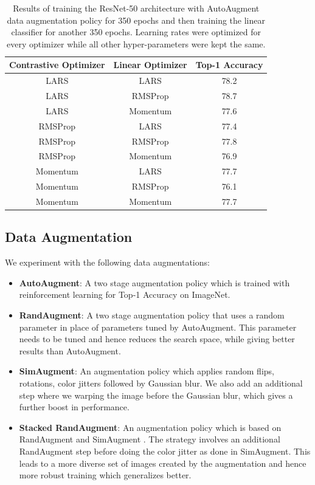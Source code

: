 \begin{table}[ht]
    \centering
    \begin{tabular}{ccc}\toprule
        {Contrastive Optimizer} & Linear Optimizer & Top-1 Accuracy \\\midrule
        LARS & LARS & 78.2 \\
        LARS & RMSProp & 78.7 \\
        LARS & Momentum & 77.6 \\ 
        RMSProp & LARS & 77.4 \\
        RMSProp & RMSProp & 77.8 \\
        RMSProp & Momentum & 76.9 \\
        Momentum & LARS & 77.7 \\
        Momentum & RMSProp & 76.1 \\
        Momentum & Momentum & 77.7 \\ \bottomrule
    \end{tabular}
    \vspace{2mm}
    \caption{Results of training the ResNet-50 architecture with AutoAugment data augmentation policy for 350 epochs and then training the linear classifier for another 350 epochs. Learning rates were optimized for every optimizer while all other hyper-parameters were kept the same.}
    \label{tab:opt}
\end{table}

\subsection{Data Augmentation}
We experiment with the following data augmentations:
\begin{itemize}
    \item {{\bf AutoAugment}: \cite{cubuk2019autoaugment} A two stage augmentation policy which is trained with reinforcement learning for Top-1 Accuracy on ImageNet.}
    \item {{\bf RandAugment}: \cite{cubuk2019randaugment} A two stage augmentation policy that uses a random parameter in place of parameters tuned by AutoAugment. This parameter needs to be tuned and hence reduces the search space, while giving better results than AutoAugment.}
    \item {{\bf SimAugment}: \cite{chen2020simple} An augmentation policy which applies random flips, rotations, color jitters followed by Gaussian blur. We also add an additional step where we  warping the image before the Gaussian blur, which gives a further boost in performance.}
    \item {{\bf Stacked RandAugment}: \cite{tian2020makes} An augmentation policy which is based on RandAugment \cite{cubuk2019randaugment} and SimAugment \cite{chen2020simple}. The strategy involves an additional RandAugment step before doing the color jitter as done in SimAugment. This leads to a more diverse set of images created by the augmentation and hence more robust training which generalizes better. }
\end{itemize}

